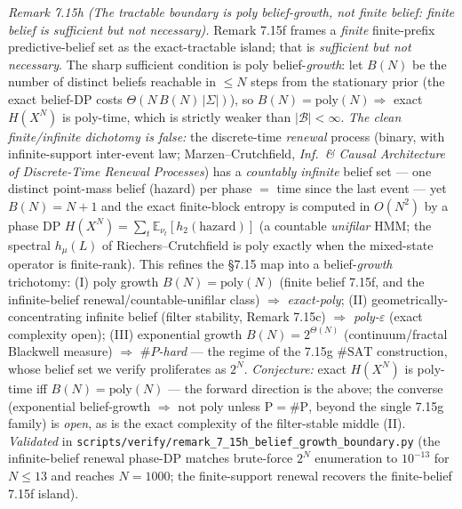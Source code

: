 \documentclass[
]{article}
\begin{document}
\emph{Remark 7.15h (The tractable boundary is poly belief-\emph{growth}, not finite belief: finite
belief is sufficient but not necessary).} Remark 7.15f frames a \emph{finite} finite-prefix
predictive-belief set as the exact-tractable island; that is \emph{sufficient but not necessary}. The
sharp sufficient condition is poly belief-\emph{growth}: let $B(N)$ be the number of distinct beliefs
reachable in $\le N$ steps from the stationary prior (the exact belief-DP costs
$\Theta(N\,B(N)\,|\Sigma|)$), so $B(N)=\mathrm{poly}(N)\Rightarrow$ exact $H(X^N)$ is poly-time, which is
strictly weaker than $|\mathcal B|<\infty$. \emph{The clean finite/infinite dichotomy is false:} the
discrete-time \emph{renewal} process (binary, with infinite-support inter-event law; Marzen--Crutchfield,
\emph{Inf.\ \& Causal Architecture of Discrete-Time Renewal Processes}) has a \emph{countably infinite}
belief set --- one distinct point-mass belief (hazard) per phase $=$ time since the last event --- yet
$B(N)=N{+}1$ and the exact finite-block entropy is computed in $O(N^2)$ by a phase DP
$H(X^N)=\sum_t\mathbb E_{\nu_t}[h_2(\mathrm{hazard})]$ (a countable \emph{unifilar} HMM; the spectral
$h_\mu(L)$ of Riechers--Crutchfield is poly exactly when the mixed-state operator is finite-rank). This
refines the §7.15 map into a belief-\emph{growth} trichotomy: (I) poly growth $B(N)=\mathrm{poly}(N)$
(finite belief 7.15f, and the infinite-belief renewal/countable-unifilar class) $\Rightarrow$
\emph{exact-poly}; (II) geometrically-concentrating infinite belief (filter stability, Remark 7.15c)
$\Rightarrow$ \emph{poly-$\varepsilon$} (exact complexity open); (III) exponential growth
$B(N)=2^{\Theta(N)}$ (continuum/fractal Blackwell measure) $\Rightarrow$ \emph{$\#P$-hard} --- the
regime of the 7.15g $\#\mathrm{SAT}$ construction, whose belief set we verify proliferates as $2^N$.
\emph{Conjecture:} exact $H(X^N)$ is poly-time iff $B(N)=\mathrm{poly}(N)$ --- the forward direction is
the above; the converse (exponential belief-growth $\Rightarrow$ not poly unless $\mathrm P=\#\mathrm P$,
beyond the single 7.15g family) is \emph{open}, as is the exact complexity of the filter-stable middle
(II). \emph{Validated} in \texttt{scripts/verify/remark\_7\_15h\_belief\_growth\_boundary.py} (the
infinite-belief renewal phase-DP matches brute-force $2^N$ enumeration to $10^{-13}$ for $N\le13$ and
reaches $N{=}1000$; the finite-support renewal recovers the finite-belief 7.15f island).
\end{document}
